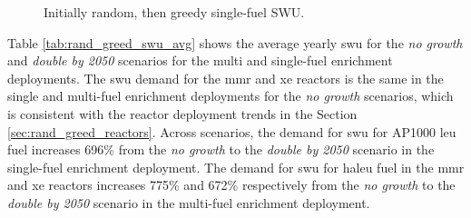 \begin{figure}[H]
    \hfill
    \caption{Initially random, then greedy single-fuel SWU.}
    \label{fig:rand_greed_of_swu}
\end{figure}


Table \ref{tab:rand_greed_swu_avg} shows the average yearly \gls{swu} for the \textit{no growth} and \textit{double by 2050} scenarios for the multi and single-fuel enrichment deployments. The \gls{swu} demand for the \gls{mmr} and \gls{xe} reactors is the same in the single and multi-fuel enrichment deployments for the \textit{no growth} scenarios, which is consistent with the reactor deployment trends in the Section \ref{sec:rand_greed_reactors}. Across scenarios, the demand for \gls{swu} for AP1000 \gls{leu} fuel increases 696\% from the \textit{no growth} to the \textit{double by 2050} scenario in the single-fuel enrichment deployment. The demand for \gls{swu} for \gls{haleu} fuel in the \gls{mmr} and \gls{xe} reactors increases 775\% and 672\% respectively from the \textit{no growth} to the \textit{double by 2050} scenario in the multi-fuel enrichment deployment.

